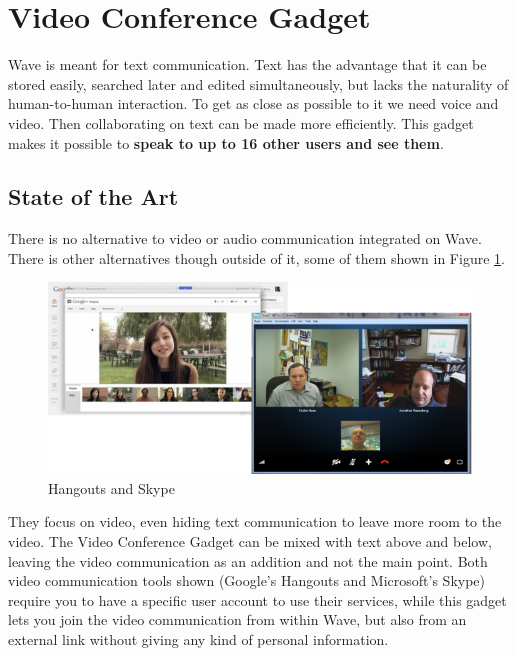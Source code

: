 \section{Video Conference Gadget}
Wave is meant for text communication. Text has the advantage that it can be stored easily, searched later and edited simultaneously, but lacks the naturality of human-to-human interaction. To get as close as possible to it we need voice and video. Then collaborating on text can be made more efficiently. This gadget makes it possible to \textbf{speak to up to 16 other users and see them}.

\label{subsec:video_soa}
\subsection{State of the Art}
There is no alternative to video or audio communication integrated on Wave. There is other alternatives though outside of it, some of them shown in Figure \ref{fig:skype_hangouts}.
\begin{figure}[H]
  \center
    \includegraphics[keepaspectratio, scale=0.6]{Media/Captures/Soa/skype_hangouts.png}
  \caption{Hangouts and Skype}
  \label{fig:skype_hangouts}
\end{figure}
They focus on video, even hiding text communication to leave more room to the video. The Video Conference Gadget can be mixed with text above and below, leaving the video communication as an addition and not the main point. Both video communication tools shown (Google's Hangouts and Microsoft's Skype) require you to have a specific user account to use their services, while this gadget lets you join the video communication from within Wave, but also from an external link without giving any kind of personal information.

